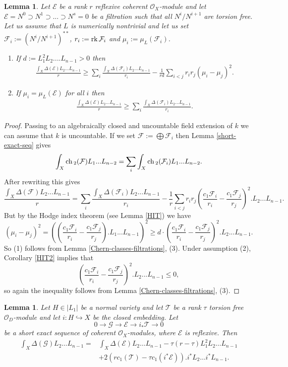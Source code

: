 \documentclass[12pt]{article}
\theoremstyle{plain}
\newtheorem{Lemma}[Thm]{\sc Lemma}
\theoremstyle{definition}
\theoremstyle{remark}
\newcommand{\cE}{{\mathcal E}}
\newcommand{\cF}{{\mathcal F}}
\newcommand{\cG}{{\mathcal G}}
\newcommand{\cO}{{\mathcal O}}
\newcommand{\cT}{{\mathcal T}}
\newcommand{\ch}{{\mathop{\rm ch \, }}}
\newcommand{\rk}{{\mathop{\rm rk \,}}}
\begin{document}
\begin{Lemma}\label{needed-for-boundedness}
Let $\cE$ be a rank $r$ reflexive coherent $\cO_X$-module and let $\cE=N^0\supset
N^1\supset ...\supset N^s=0$ be a filtration such that all $N^i/N^{i+1}$ are torsion free. 
Let us assume that $L$ is numerically nontrivial and let us
set $\cF_i:=(N^i/N^{i+1})^{**}$, $r_i:=\rk \cF_i$ and $\mu_i:= \mu _L(\cF_i)$. 
\begin{enumerate}
	\item 
	If $d:=L_1^2L_2....L_{n-1}>0$ then
	\begin{align*}
		\frac{\int _X \Delta  (\cE)L_2...L_{n-1}}{r}\ge \sum _i \frac{\int _X \Delta  (\cF_i)L_2...L_{n-1}}{r_i}-
		\frac{1}{rd}\sum _{i<j} r_ir_j\left(\mu_i -  \mu_j\right)^2.
	\end{align*}
	\item 	If $\mu_i=\mu_L(\cE)$ for all $i$ then
	\begin{align*}
		\frac{\int _X \Delta  (\cE)L_2...L_{n-1}}{r}\ge \sum _i \frac{\int _X \Delta  (\cF_i)L_2...L_{n-1}}{r_i}.
	\end{align*}
\end{enumerate}
\end{Lemma}

\begin{proof}
Passing to an algebraically closed and uncountable field extension of $k$ we can assume that $k$ is uncountable. If we set $\cF:=\bigoplus \cF_i$ then Lemma \ref{short-exact-seq} gives
$$\int _X \ch _2 (\cF)L_1...L_{n-2} = \sum _i \int _X \ch _2 (\cF _i)L_1...L_{n-2} .$$
After rewriting this gives
$$
\frac{\int _X \Delta  (\cF)L_2...L_{n-1}}{r}= \sum _i \frac{\int _X \Delta  (\cF_i)L_2...L_{n-1}}{r_i}-
\frac{1}{r}\sum _{i<j} r_ir_j\left( \frac{c_1\cF _i}{r_i} -  \frac{c_1\cF _j}{r_j} \right)^2.L_2...L_{n-1}.$$
But by the Hodge index theorem (see Lemma \ref{HIT}) we have
$$\left(\mu_i -  \mu_j\right)^2 =\left( \left( \frac{c_1\cF _i}{r_i} -  \frac{c_1\cF _j}{r_j} \right).L_1...L_{n-1}\right)^2
\ge d\cdot   \left( \frac{c_1\cF _i}{r_i} -  \frac{c_1\cF _j}{r_j} \right)^2.L_2...L_{n-1}.$$
So (1) follows from Lemma \ref{Chern-classes-filtrations}, (3). Under assumption (2), Corollary \ref{HIT2}
implies that 
$$\left( \frac{c_1\cF _i}{r_i} -  \frac{c_1\cF _j}{r_j} \right)^2.L_2...L_{n-1}\le 0,$$
so again the inequality follows from Lemma \ref{Chern-classes-filtrations}, (3).
\end{proof}

\begin{Lemma}\label{Delta-computation}
	Let  $H\in |L_1|$ be a normal variety and let $\cT$ be a rank $\tau$ torsion free $\cO_D$-module  and let $i: H\hookrightarrow X$ be the closed embedding. Let
	$$0\to \cG\to 
	\cE \to i_*\cT\to 0$$
	be a short exact sequence of coherent $\cO_X$-modules, where $\cE$ is reflexive. 
	Then 
	\begin{align*}
		\int_X \Delta (\cG)L_2\dots L_{n-1}
		=&\int_X \Delta (\cE)L_2\dots L_{n-1}-\tau (r-\tau ) L_1^2L_2\dots L_{n-1}\\
		&+2 (r c_1(\cT)-\tau c_1(i^*\cE)). i^*L_2\dots i^*L_{n-1}.
	\end{align*}
\end{Lemma}
\end{document}

